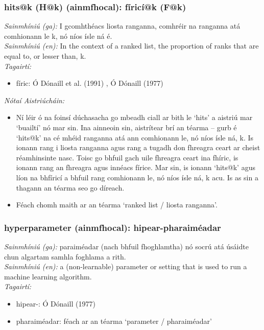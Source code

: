 \subsubsection*{hits@k (H@k) (ainmfhocal): fíricí@k (F@k)}
 \noindent \textit{Sainmhíniú (ga):} I gcomhthéacs liosta ranganna, comhréir na ranganna atá comhionann le k, nó níos ísle ná é.
\\
 \noindent \textit{Sainmhíniú (en):} In the context of a ranked list, the proportion of ranks that are equal to, or lesser than, k.
\\
 \noindent \textit{Tagairtí:}
\begin{itemize}
	\item fíric: Ó Dónaill et al. (1991) \cite{focloir-beag}, Ó Dónaill (1977) \cite{odonaill}
\end{itemize}

 \noindent \textit{Nótaí Aistriúcháin:}
\begin{itemize}
	\item Ní léir ó na foinsí dúchasacha go mbeadh ciall ar bith le `hits' a aistriú mar `buailtí' nó mar sin. Ina ainneoin sin, aistrítear brí an téarma -- gurb é `hits@k' na cé mhéid ranganna atá ann comhionann le, nó níos ísle ná, k. Is ionann rang i liosta ranganna agus rang a tugadh don fhreagra ceart ar cheist réamhinsinte nasc. Toisc go bhfuil gach uile fhreagra ceart ina fhíric, is ionann rang an fhreagra agus innéacs fírice. Mar sin, is ionann `hits@k' agus líon na bhfíricí a bhfuil rang comhionann le, nó níos ísle ná, k acu. Is as sin a thagann an téarma seo go díreach.
	\item Féach chomh maith ar an téarma `ranked list / liosta ranganna'.
\end{itemize}


\subsubsection*{hyperparameter (ainmfhocal): hipear-pharaiméadar}
 \noindent \textit{Sainmhíniú (ga):} paraiméadar (nach bhfuil fhoghlamtha) nó socrú atá úsáidte chun algartam samhla foghlama a rith.
\\
 \noindent \textit{Sainmhíniú (en):} a (non-learnable) parameter or setting that is used to run a machine learning algorithm.
\\
 \noindent \textit{Tagairtí:}
\begin{itemize}
	\item hipear-: Ó Dónaill (1977) \cite{odonaill}
	\item pharaiméadar: féach ar an téarma `parameter / pharaiméadar'
\end{itemize}

